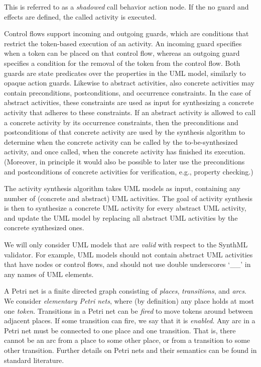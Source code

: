 \documentclass{article}
\theoremstyle{definition}
\begin{document}
\begin{description}
\begin{itemize}
\begin{itemize}
\begin{itemize}
				This is referred to as a \emph{shadowed} call behavior action node. 
				If the no guard and effects are defined, the called activity is executed.
			\end{itemize}
			Control flows support incoming and outgoing guards, which are conditions that restrict the token-based execution of an activity. 
			An incoming guard specifies when a token can be placed on that control flow, whereas an outgoing guard specifies a condition for the removal of the token from the control flow. 
			Both guards are state predicates over the properties in the UML model, similarly to opaque action guards.
			Likewise to abstract activities, also concrete activities may contain preconditions, postconditions, and occurrence constraints.
			In the case of abstract activities, these constraints are used as input for synthesizing a concrete activity that adheres to these constraints.
			If an abstract activity is allowed to call a concrete activity by its occurrence constraints, then the preconditions and postconditions of that concrete activity are used by the synthesis algorithm to determine when the concrete activity can be called by the to-be-synthesized activity, and once called, when the concrete activity has finished its execution.
			(Moreover, in principle it would also be possible to later use the preconditions and postconditions of concrete activities for verification, e.g., property checking.)
		\end{itemize}
	\end{itemize}

	The activity synthesis algorithm takes UML models as input, containing any number of (concrete and abstract) UML activities.
	The goal of activity synthesis is then to synthesize a concrete UML activity for every abstract UML activity, and update the UML model by replacing all abstract UML activities by the concrete synthesized ones.

	We will only consider UML models that are \emph{valid} with respect to the SynthML validator.
	For example, UML models should not contain abstract UML activities that have nodes or control flows, and should not use double underscores `\_\_' in any names of UML elements.

	\item[Petri nets.]
	A Petri net is a finite directed graph consisting of \emph{places}, \emph{transitions}, and \emph{arcs}.
	We consider \emph{elementary Petri nets}, where (by definition) any place holds at most one \emph{token}.
	Transitions in a Petri net can be \emph{fired} to move tokens around between adjacent places.
	If some transition can fire, we say that it is \emph{enabled}.
	Any arc in a Petri net must be connected to one place and one transition.
	That is, there cannot be an arc from a place to some other place, or from a transition to some other transition.
	Further details on Petri nets and their semantics can be found in standard literature.


\end{description}
\end{document}
